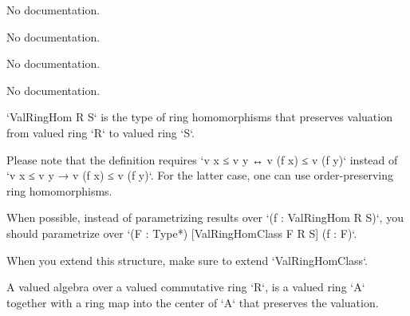 \begin{definition}\label{DiscreteValuation.ofInt}
        \leanok
                No documentation.
    \end{definition}

\begin{definition}\label{DiscretelyValued.extensionFiniteDimension}
                No documentation.
    \end{definition}

\begin{theorem}\label{Valuation.isEquiv_of_finiteDimensional}
                No documentation.
    \end{theorem}

\begin{definition}\label{AlgEquiv.toValAlgEquiv}
                No documentation.
    \end{definition}

\begin{definition}\label{ValRingHom}
        \leanok
                `ValRingHom R S` is the type of ring homomorphisms that preserves valuation from valued ring `R` to valued ring `S`.

Please note that the definition requires `v x ≤ v y ↔ v (f x) ≤ v (f y)` instead of `v x ≤ v y → v (f x) ≤ v (f y)`. For the latter case, one can use order-preserving ring homomorphisms.

When possible, instead of parametrizing results over `(f : ValRingHom R S)`,
you should parametrize over `(F : Type*) [ValRingHomClass F R S] (f : F)`.

When you extend this structure, make sure to extend `ValRingHomClass`.
    \end{definition}

\begin{definition}\label{ValAlgebra}
        \leanok
                A valued algebra over a valued commutative ring `R`, is a valued ring `A` together with a ring map into the center of `A` that preserves the valuation.
    \end{definition}

